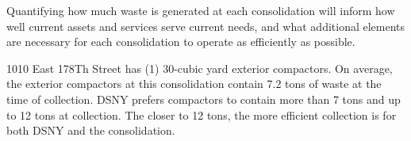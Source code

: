 
    Quantifying how much waste is generated at each consolidation will inform how well current assets and services serve current needs, and what additional elements are necessary for each consolidation to operate as efficiently as possible.
    
    1010 East 178Th Street has (1) 30-cubic yard exterior compactors. On average, the exterior compactors at this consolidation contain 7.2 tons of waste at the time of collection. DSNY prefers compactors to contain more than 7 tons and up to 12 tons at collection. The closer to 12 tons, the more efficient collection is for both DSNY and the consolidation.